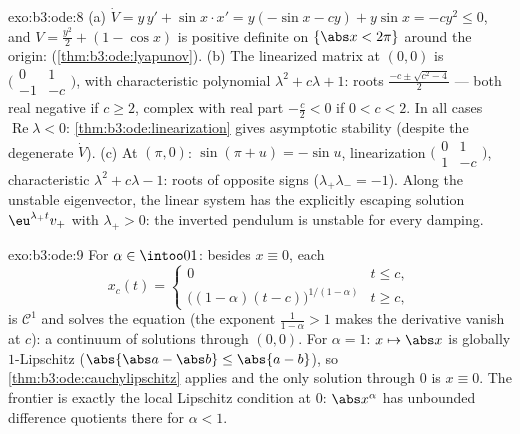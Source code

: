\begin{solution}{exo:b3:ode:8}
(a) $\dot V = y\,y' + \sin x\cdot x' = y(-\sin x - cy) +
y\sin x = -cy^2 \leq 0$, and $V = \frac{y^2}2 + (1 - \cos x)$
is positive definite on $\{\abs x < 2\pi\}$ around the
origin:  (\cref{thm:b3:ode:lyapunov}).
(b) The linearized matrix at $(0,0)$ is
$\bigl(\begin{smallmatrix}0 & 1\\ -1 &
-c\end{smallmatrix}\bigr)$, with characteristic polynomial
$\lambda^2 + c\lambda + 1$: roots $\frac{-c \pm \sqrt{c^2 -
4}}2$ --- both real negative if $c \geq 2$, complex with real
part $-\frac c2 < 0$ if $0 < c < 2$. In all cases
$\operatorname{Re}\lambda < 0$:
\cref{thm:b3:ode:linearization} gives asymptotic stability
(despite the degenerate $\dot V$).
(c) At $(\pi, 0)$: $\sin(\pi + u) = -\sin u$, linearization
$\bigl(\begin{smallmatrix}0&1\\1&-c\end{smallmatrix}\bigr)$,
characteristic $\lambda^2 + c\lambda - 1$: roots of opposite
signs ($\lambda_+\lambda_- = -1$). Along the unstable
eigenvector, the linear system has the explicitly escaping
solution $\eu^{\lambda_+t}v_+$ with $\lambda_+ > 0$: the
inverted pendulum is unstable for every damping.
\end{solution}

\begin{solution}{exo:b3:ode:9}
For $\alpha \in \intoo01$: besides $x \equiv 0$, each
\[
x_c(t) = \begin{cases}0 & t \leq c,\\
\bigl((1-\alpha)(t - c)\bigr)^{1/(1-\alpha)} & t \geq c,
\end{cases}
\]
is $\mathcal C^1$ and solves the equation (the exponent
$\frac1{1-\alpha} > 1$ makes the derivative vanish at $c$): a
continuum of solutions through $(0,0)$. For $\alpha = 1$: $x
\mapsto \abs x$ is globally $1$-Lipschitz
($\abs{\abs a - \abs b} \leq \abs{a - b}$), so
\cref{thm:b3:ode:cauchylipschitz} applies and the only
solution through $0$ is $x \equiv 0$. The frontier is exactly
the local Lipschitz condition at $0$: $\abs x^\alpha$ has
unbounded difference quotients there for $\alpha < 1$.
\end{solution}

